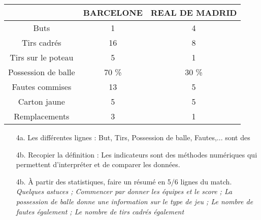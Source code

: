 \begin{center}
  \begin{tabular}{|c|c|c|} \hline
                        & BARCELONE & REAL DE MADRID \\  \hline
    Buts                &         1 &              4 \\  \hline
    Tirs cadrés         &        16 & 8 \\  \hline
    Tirs sur le poteau  &         5 & 1  \\  \hline
    Possession de balle &     70 \% & 30 \%  \\ \hline
    Fautes commises     &        13 & 5 \\  \hline
    Carton jaune        &         5 & 5 \\  \hline
    Remplacements       &         3 & 1 \\  \hline
  \end{tabular}
\end{center}

\begin{enumerate}
  \item[4a.] Les  différentes lignes : But, Tirs, Possession de balle, Fautes,... sont des \dotfill
  \item[4b.] Recopier la définition : \og Les indicateurs sont des méthodes numériques qui permettent d’interpréter et de comparer les données. \fg \dotfill \\ \Pointilles[1]
  \item[4b.] À partir des statistiques, faire un résumé en 5/6 lignes du match.
  \textit{Quelques astuces ; Commencer par donner les équipes et le score ; La possession de balle donne une information sur le type de jeu ; Le nombre de fautes également ; Le nombre de tirs cadrés également}

  \Pointilles[10]
\end{enumerate} 

